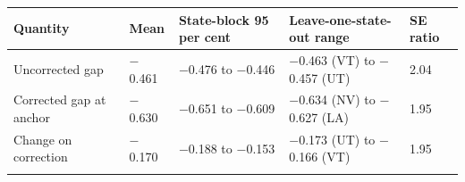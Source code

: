\setlength{\tabcolsep}{3pt}
\begin{tabular}{@{}lllll@{}}
\toprule
Quantity & Mean & State-block 95 per cent & Leave-one-state-out range & SE ratio\\
\midrule
Uncorrected gap & $-$0.461 & $-$0.476 to $-$0.446 & $-$0.463 (VT) to $-$0.457 (UT) & 2.04\\
Corrected gap at anchor & $-$0.630 & $-$0.651 to $-$0.609 & $-$0.634 (NV) to $-$0.627 (LA) & 1.95\\
Change on correction & $-$0.170 & $-$0.188 to $-$0.153 & $-$0.173 (UT) to $-$0.166 (VT) & 1.95\\
\botrule
\end{tabular}
